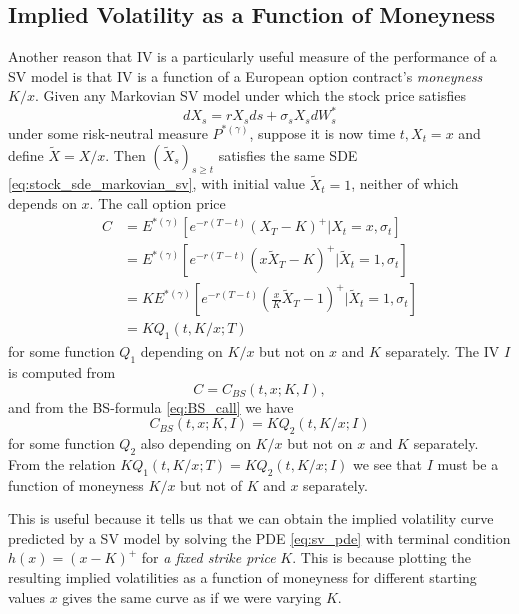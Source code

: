 \documentclass[a4paper,12pt]{article}
\numberwithin{equation}{section}
\theoremstyle{definition}
\theoremstyle{remark}
\begin{document}
\subsection{Implied Volatility as a Function of Moneyness}
Another reason that IV is a particularly useful measure of the 
performance of a SV model is that IV is a function of a European 
option contract's \textit{moneyness} $K/x$. Given any Markovian SV model under 
which the stock price satisfies 
\begin{equation}\label{eq:stock_sde_markovian_sv}
    dX_{s}=rX_{s}ds+\sigma_{s}X_{s}dW_{s}^{*}
\end{equation}
under some risk-neutral measure $P^{*(\gamma)}$, suppose it is now 
time $t,X_{t}=x$ and define $\widetilde{X}=X/x$. Then 
$(\widetilde{X}_{s})_{s\geq t}$ satisfies the same SDE 
\eqref{eq:stock_sde_markovian_sv}, with initial value 
$\widetilde{X}_{t}=1$, neither of which depends on $x$. The call 
option price 
\begin{equation}
    \begin{split}
        C&=E^{*(\gamma)}[e^{-r(T-t)}(X_{T}-K)^{+}|X_{t}=x,
        \sigma_{t}] \\
        &=E^{*(\gamma)}[e^{-r(T-t)}(x\widetilde{X}_{T}-K)^{+}
        |\widetilde{X}_{t}=1,\sigma_{t}] \\
        &=KE^{*(\gamma)}[e^{-r(T-t)}(\frac{x}{K}\widetilde{X}_{T}
        -1)^{+}|\widetilde{X}_{t}=1,\sigma_{t}] \\
        &=KQ_{1}(t,K/x;T)
    \end{split}
\end{equation}
for some function $Q_{1}$ depending on $K/x$ but not on $x$ and 
$K$ separately. The IV $I$ is computed from 
\begin{equation}
    C=C_{BS}(t,x;K,I),
\end{equation}
and from the BS-formula \eqref{eq:BS_call} we have 
\begin{equation}
    C_{BS}(t,x;K,I)=KQ_{2}(t,K/x;I)
\end{equation}
for some function $Q_{2}$ also depending on $K/x$ but not on $x$ 
and $K$ separately. From the relation $KQ_{1}(t,K/x;T)=KQ_{2}(t,K/x;I)$ 
we see that $I$ must be a function of moneyness $K/x$ but not of 
$K$ and $x$ separately.

This is useful because it tells us that we can obtain the implied 
volatility curve predicted by a SV model by solving the PDE 
\eqref{eq:sv_pde} with terminal condition $h(x)=(x-K)^{+}$ for 
\textit{a fixed strike price} $K$. This is because plotting the 
resulting implied volatilities as a function of moneyness for 
different starting values $x$ gives the same curve as if we were 
varying $K$.
\end{document}

